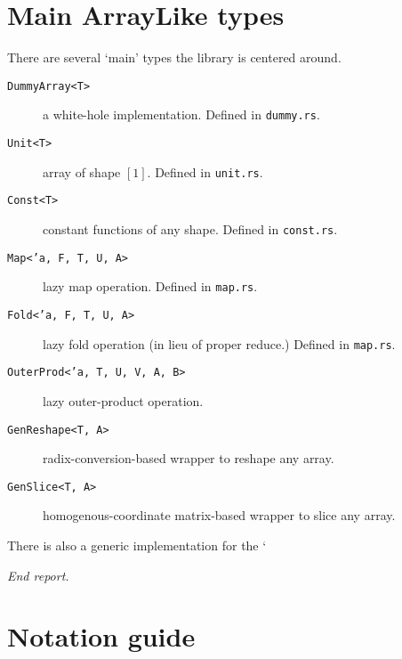 \documentclass{DIKU-report-variant}
\begin{document}
\section{Main ArrayLike types}

There are several `main' types the library is centered around.
\begin{description}
  \item[\texttt{DummyArray<T>}] a white-hole implementation. Defined in \texttt{dummy.rs}.
  \item[\texttt{Unit<T>}] array of shape \([1]\). Defined in \texttt{unit.rs}.
  \item[\texttt{Const<T>}] constant functions of any shape. Defined in \texttt{const.rs}.
  \item[\texttt{Map<'a, F, T, U, A>}] lazy map operation. Defined in \texttt{map.rs}.
  \item[\texttt{Fold<'a, F, T, U, A>}] lazy fold operation (in lieu of proper reduce.) Defined in \texttt{map.rs}.
  \item[\texttt{OuterProd<'a, T, U, V, A, B>}] lazy outer-product operation.
  \item[\texttt{GenReshape<T, A>}] radix-conversion-based wrapper to reshape any array.
  \item[\texttt{GenSlice<T, A>}] homogenous-coordinate matrix-based wrapper to slice any array.
\end{description}

There is also a generic implementation for the `

\vfill
\begin{center}\itshape End report.\end{center}
\clearpage

\appendix
\renewcommand\thesection{\Alph{section}}
{}

\section{Notation guide}
\end{document}
